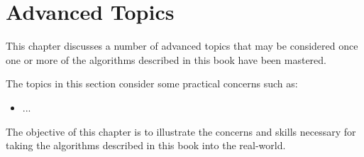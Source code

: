 


\renewcommand{\bibsection}{\subsection{\bibname}}
\chapter{Advanced Topics}
\label{ch:advanced}
This chapter discusses a number of advanced topics that may be considered once one or more of the algorithms described in this book have been mastered.

The topics in this section consider some practical concerns such as: 

\begin{itemize}
  \item ...
\end{itemize}

The objective of this chapter is to illustrate the concerns and skills necessary for taking the algorithms described in this book into the real-world.

\newpage\begin{bibunit}\putbib\end{bibunit}
\newpage\begin{bibunit}\putbib\end{bibunit}
\newpage\begin{bibunit}\putbib\end{bibunit}
\newpage\begin{bibunit}\putbib\end{bibunit}

